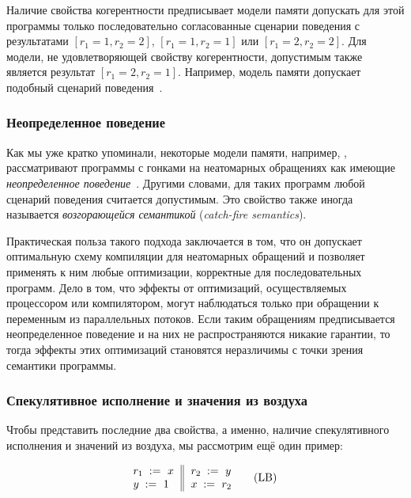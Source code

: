Наличие свойства когерентности предписывает модели памяти 
допускать для этой программы только последовательно 
согласованные сценарии поведения с результатами
${[r_1=1, r_2=2]}$, ${[r_1=1, r_2=1]}$ или ${[r_1=2, r_2=2]}$.
Для модели, не удовлетворяющей свойству когерентности, 
допустимым также является результат ${[r_1=2, r_2=1]}$.
Например, модель памяти \Java допускает подобный сценарий поведения~\cite{Manson-al:POPL05}.

\subsubsection{Неопределенное поведение}
\label{sec:background:ub}

Как мы уже кратко упоминали, некоторые модели памяти, например, \CPP, рассматривают программы с гонками на неатомарных обращениях как имеющие 
\emph{неопределенное поведение}~\cite{Boehm-Adve:PLDI08}.
Другими словами, для таких программ любой сценарий поведения считается допустимым. 
Это свойство также иногда называется 
\emph{возгорающейся семантикой} (\emph{catch-fire semantics}).
 
Практическая польза такого подхода заключается в том,
что он допускает оптимальную схему компиляции для 
неатомарных обращений и позволяет применять к ним 
любые оптимизации, корректные для последовательных программ.
Дело в том, что эффекты от оптимизаций, осуществляемых процессором или компилятором, могут наблюдаться только при обращении к переменным из параллельных потоков. 
Если таким обращениям предписывается неопределенное поведение и на них 
не распространяются никакие гарантии, то тогда эффекты этих оптимизаций 
становятся неразличимы с точки зрения семантики программы. 
 
\subsubsection{Спекулятивное исполнение и значения из воздуха}
\label{sec:background:oota}

Чтобы представить последние два свойства, 
а именно, наличие спекулятивного исполнения и значений из воздуха, 
мы рассмотрим ещё один пример:

\begin{equation*}
\inarrII{
  \readInst{}{r_1}{x}     \\
  \writeInst{}{y}{1}      \\
}{
  \readInst{}{r_2}{y}     \\
  \writeInst{}{x}{r_2}    \\
}
\tag{LB}\label{ex:lb}
\end{equation*}

